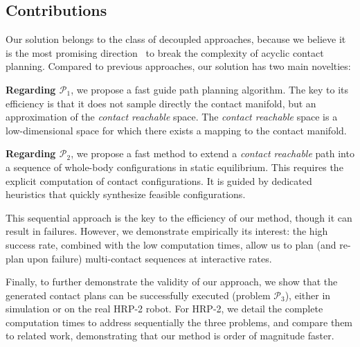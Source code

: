 \subsection{Contributions}

Our solution belongs to the class of decoupled approaches, because we believe it is the most promising direction~\citep{DBLP:conf/iser/EscandeKMG08} to break the complexity of acyclic contact planning. Compared to previous approaches, our solution has two main novelties: 

\noindent \textbf{Regarding $\mathcal{P}_1$}, we propose a fast guide path planning algorithm. The key to its efficiency is that it does not sample
directly the contact manifold, but an approximation of the \textit{contact reachable} space. The \textit{contact reachable} space is a low-dimensional space for which there exists a mapping to the contact manifold.

\noindent \textbf{Regarding $\mathcal{P}_2$},  we propose a fast method to extend a \textit{contact reachable} path into a sequence of whole-body configurations in static equilibrium. This  requires the explicit computation of contact configurations. It is guided by dedicated heuristics that quickly synthesize feasible configurations.

This sequential approach is the key to the efficiency of our method, though it
can result in failures. However, we demonstrate empirically its interest: the high success rate, combined with the low computation times, allow us to plan (and re-plan upon failure) multi-contact sequences at \gls{interactive} rates.

Finally, to further demonstrate the validity of our approach, we show that the generated contact plans  can be successfully executed (problem  $\mathcal{P}_3$), either in simulation or on the real HRP-2 robot. For HRP-2, we detail the complete computation times to address sequentially the three problems, and compare them to related work, demonstrating that our method is order of magnitude faster.


